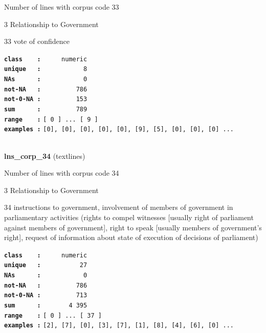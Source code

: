 \documentclass[]{article}
\begin{document}
Number of lines with corpus code 33

3 Relationship to Government

33 vote of confidence

\textbf{\texttt{class\ \ \ \ :}} \texttt{~~~~~numeric}\\
\textbf{\texttt{unique\ \ \ :}} \texttt{~~~~~~~~~~~8}\\
\textbf{\texttt{NAs\ \ \ \ \ \ :}} \texttt{~~~~~~~~~~~0}\\
\textbf{\texttt{not-NA\ \ \ :}} \texttt{~~~~~~~~~786}\\
\textbf{\texttt{not-0-NA\ :}} \texttt{~~~~~~~~~153}\\
\textbf{\texttt{sum\ \ \ \ \ \ :}} \texttt{~~~~~~~~~789}\\
\textbf{\texttt{range\ \ \ \ :}}
\texttt{{[}\ 0\ {]}\ ...\ {[}\ 9\ {]}}\\
\textbf{\texttt{examples\ :}}
\texttt{{[}0{]},\ {[}0{]},\ {[}0{]},\ {[}0{]},\ {[}0{]},\ {[}9{]},\ {[}5{]},\ {[}0{]},\ {[}0{]},\ {[}0{]}\ ...}\\

~

\textbf{lns\_corp\_34} (textlines)

Number of lines with corpus code 34

3 Relationship to Government

34 instructions to government, involvement of members of government in
parliamentary activities (rights to compel witnesses {[}usually right of
parliament against members of government{]}, right to speak {[}usually
members of government's right{]}, request of information about state of
execution of decisions of parliament)

\textbf{\texttt{class\ \ \ \ :}} \texttt{~~~~~numeric}\\
\textbf{\texttt{unique\ \ \ :}} \texttt{~~~~~~~~~~27}\\
\textbf{\texttt{NAs\ \ \ \ \ \ :}} \texttt{~~~~~~~~~~~0}\\
\textbf{\texttt{not-NA\ \ \ :}} \texttt{~~~~~~~~~786}\\
\textbf{\texttt{not-0-NA\ :}} \texttt{~~~~~~~~~713}\\
\textbf{\texttt{sum\ \ \ \ \ \ :}} \texttt{~~~~~~~4~395}\\
\textbf{\texttt{range\ \ \ \ :}}
\texttt{{[}\ 0\ {]}\ ...\ {[}\ 37\ {]}}\\
\textbf{\texttt{examples\ :}}
\texttt{{[}2{]},\ {[}7{]},\ {[}0{]},\ {[}3{]},\ {[}7{]},\ {[}1{]},\ {[}8{]},\ {[}4{]},\ {[}6{]},\ {[}0{]}\ ...}\\
\end{document}
